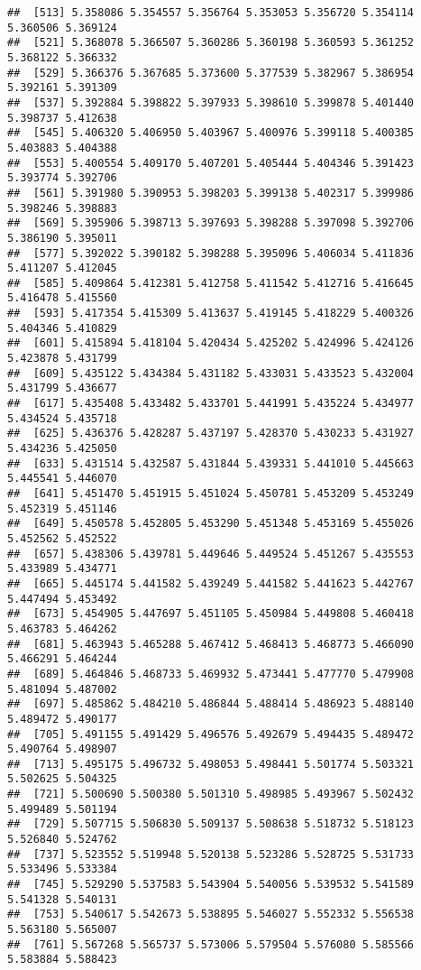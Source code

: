 \documentclass[
]{article}
\begin{document}
\begin{verbatim}
##  [513] 5.358086 5.354557 5.356764 5.353053 5.356720 5.354114 5.360506 5.369124
##  [521] 5.368078 5.366507 5.360286 5.360198 5.360593 5.361252 5.368122 5.366332
##  [529] 5.366376 5.367685 5.373600 5.377539 5.382967 5.386954 5.392161 5.391309
##  [537] 5.392884 5.398822 5.397933 5.398610 5.399878 5.401440 5.398737 5.412638
##  [545] 5.406320 5.406950 5.403967 5.400976 5.399118 5.400385 5.403883 5.404388
##  [553] 5.400554 5.409170 5.407201 5.405444 5.404346 5.391423 5.393774 5.392706
##  [561] 5.391980 5.390953 5.398203 5.399138 5.402317 5.399986 5.398246 5.398883
##  [569] 5.395906 5.398713 5.397693 5.398288 5.397098 5.392706 5.386190 5.395011
##  [577] 5.392022 5.390182 5.398288 5.395096 5.406034 5.411836 5.411207 5.412045
##  [585] 5.409864 5.412381 5.412758 5.411542 5.412716 5.416645 5.416478 5.415560
##  [593] 5.417354 5.415309 5.413637 5.419145 5.418229 5.400326 5.404346 5.410829
##  [601] 5.415894 5.418104 5.420434 5.425202 5.424996 5.424126 5.423878 5.431799
##  [609] 5.435122 5.434384 5.431182 5.433031 5.433523 5.432004 5.431799 5.436677
##  [617] 5.435408 5.433482 5.433701 5.441991 5.435224 5.434977 5.434524 5.435718
##  [625] 5.436376 5.428287 5.437197 5.428370 5.430233 5.431927 5.434236 5.425050
##  [633] 5.431514 5.432587 5.431844 5.439331 5.441010 5.445663 5.445541 5.446070
##  [641] 5.451470 5.451915 5.451024 5.450781 5.453209 5.453249 5.452319 5.451146
##  [649] 5.450578 5.452805 5.453290 5.451348 5.453169 5.455026 5.452562 5.452522
##  [657] 5.438306 5.439781 5.449646 5.449524 5.451267 5.435553 5.433989 5.434771
##  [665] 5.445174 5.441582 5.439249 5.441582 5.441623 5.442767 5.447494 5.453492
##  [673] 5.454905 5.447697 5.451105 5.450984 5.449808 5.460418 5.463783 5.464262
##  [681] 5.463943 5.465288 5.467412 5.468413 5.468773 5.466090 5.466291 5.464244
##  [689] 5.464846 5.468733 5.469932 5.473441 5.477770 5.479908 5.481094 5.487002
##  [697] 5.485862 5.484210 5.486844 5.488414 5.486923 5.488140 5.489472 5.490177
##  [705] 5.491155 5.491429 5.496576 5.492679 5.494435 5.489472 5.490764 5.498907
##  [713] 5.495175 5.496732 5.498053 5.498441 5.501774 5.503321 5.502625 5.504325
##  [721] 5.500690 5.500380 5.501310 5.498985 5.493967 5.502432 5.499489 5.501194
##  [729] 5.507715 5.506830 5.509137 5.508638 5.518732 5.518123 5.526840 5.524762
##  [737] 5.523552 5.519948 5.520138 5.523286 5.528725 5.531733 5.533496 5.533384
##  [745] 5.529290 5.537583 5.543904 5.540056 5.539532 5.541589 5.541328 5.540131
##  [753] 5.540617 5.542673 5.538895 5.546027 5.552332 5.556538 5.563180 5.565007
##  [761] 5.567268 5.565737 5.573006 5.579504 5.576080 5.585566 5.583884 5.588423

\end{verbatim}
\end{document}
